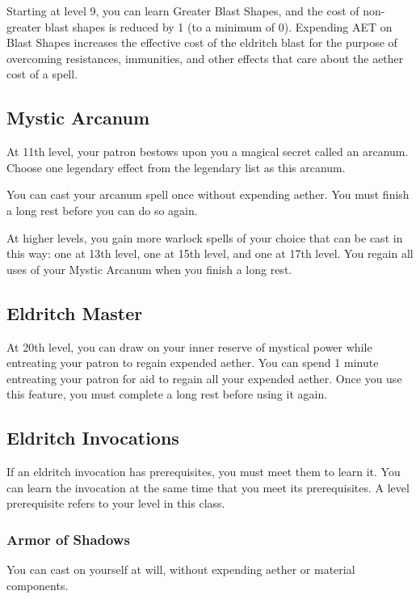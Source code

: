 Starting at level 9, you can learn Greater Blast Shapes, and the cost of non-greater blast shapes is reduced by 1 (to a minimum of 0). Expending AET on Blast Shapes increases the effective cost of the eldritch blast for the purpose of overcoming resistances, immunities, and other effects that care about the aether cost of a spell.

\subsection{Mystic Arcanum}

At 11th level, your patron bestows upon you a magical secret called an arcanum. Choose one legendary effect from the legendary list as this arcanum.

You can cast your arcanum spell once without expending aether. You must finish a long rest before you can do so again.

At higher levels, you gain more warlock spells of your choice that can be cast in this way: one at 13th level, one at 15th level, and one at 17th level. You regain all uses of your Mystic Arcanum when you finish a long rest.

\subsection{Eldritch Master}

At 20th level, you can draw on your inner reserve of mystical power while entreating your patron to regain expended aether. You can spend 1 minute entreating your patron for aid to regain all your expended aether. Once you use this feature, you must complete a long rest before using it again.

\subsection{Eldritch Invocations}

If an eldritch invocation has prerequisites, you must meet them to learn it. You can learn the invocation at the same time that you meet its prerequisites. A level prerequisite refers to your level in this class.

\subsubsection{Armor of Shadows}

You can cast  on yourself at will, without expending aether or material components.


